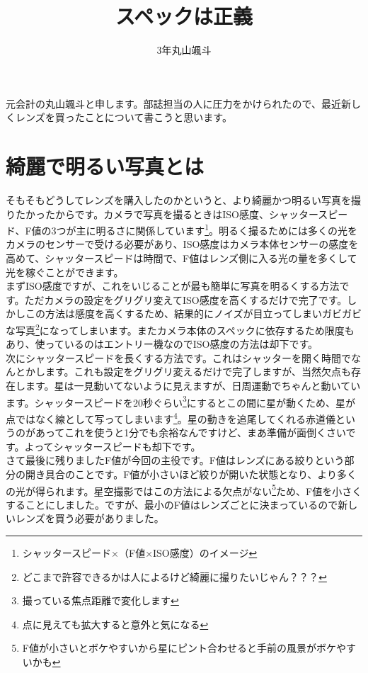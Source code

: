 \documentclass[a4paper.10pt]{jarticle}
\begin{document}
\title{スペックは正義}
\author{3年丸山颯斗}
\date{}
\maketitle

元会計の丸山颯斗と申します。部誌担当の人に圧力をかけられたので、最近新しくレンズを買ったことについて書こうと思います。\\
\section{綺麗で明るい写真とは}
そもそもどうしてレンズを購入したのかというと、より綺麗かつ明るい写真を撮りたかったからです。カメラで写真を撮るときはISO感度、シャッタースピード、F値の3つが主に明るさに関係しています\footnote{シャッタースピード×（F値×ISO感度）のイメージ}。明るく撮るためには多くの光をカメラのセンサーで受ける必要があり、ISO感度はカメラ本体センサーの感度を高めて、シャッタースピードは時間で、F値はレンズ側に入る光の量を多くして光を稼ぐことができます。\\
まずISO感度ですが、これをいじることが最も簡単に写真を明るくする方法です。ただカメラの設定をグリグリ変えてISO感度を高くするだけで完了です。しかしこの方法は感度を高くするため、結果的にノイズが目立ってしまいガビガビな写真\footnote{どこまで許容できるかは人によるけど綺麗に撮りたいじゃん？？？}になってしまいます。またカメラ本体のスペックに依存するため限度もあり、使っているのはエントリー機なのでISO感度の方法は却下です。\\
次にシャッタースピードを長くする方法です。これはシャッターを開く時間でなんとかします。これも設定をグリグリ変えるだけで完了しますが、当然欠点も存在します。星は一見動いてないように見えますが、日周運動でちゃんと動いています。シャッタースピードを20秒ぐらい\footnote{撮っている焦点距離で変化します}にするとこの間に星が動くため、星が点ではなく線として写ってしまいます\footnote{点に見えても拡大すると意外と気になる}。星の動きを追尾してくれる赤道儀というのがあってこれを使うと1分でも余裕なんですけど、まあ準備が面倒くさいです。よってシャッタースピードも却下です。\\
さて最後に残りましたF値が今回の主役です。F値はレンズにある絞りという部分の開き具合のことです。F値が小さいほど絞りが開いた状態となり、より多くの光が得られます。星空撮影ではこの方法による欠点がない\footnote{F値が小さいとボケやすいから星にピント合わせると手前の風景がボケやすいかも}ため、F値を小さくすることにしました。ですが、最小のF値はレンズごとに決まっているので新しいレンズを買う必要がありました。
\end{document}
